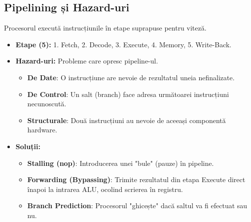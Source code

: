 \documentclass[12pt,a4paper]{article}
\begin{document}
\subsection{Pipelining și Hazard-uri}
Procesorul execută instrucțiunile în etape suprapuse pentru viteză.
\begin{itemize}
    \item \textbf{Etape (5):} 1. Fetch, 2. Decode, 3. Execute, 4. Memory, 5. Write-Back.
    \item \textbf{Hazard-uri:} Probleme care opresc pipeline-ul.
        \begin{itemize}
            \item \textbf{De Date}: O instrucțiune are nevoie de rezultatul uneia nefinalizate.
            \item \textbf{De Control}: Un salt (branch) face adresa următoarei instrucțiuni necunoscută.
            \item \textbf{Structurale}: Două instrucțiuni au nevoie de aceeași componentă hardware.
        \end{itemize}
    \item \textbf{Soluții:}
        \begin{itemize}
            \item \textbf{Stalling (nop)}: Introducerea unei "bule" (pauze) în pipeline.
            \item \textbf{Forwarding (Bypassing)}: Trimite rezultatul din etapa Execute direct înapoi la intrarea ALU, ocolind scrierea în registru.
            \item \textbf{Branch Prediction}: Procesorul "ghicește" dacă saltul va fi efectuat sau nu.
        \end{itemize}
\end{itemize}
\end{document}
